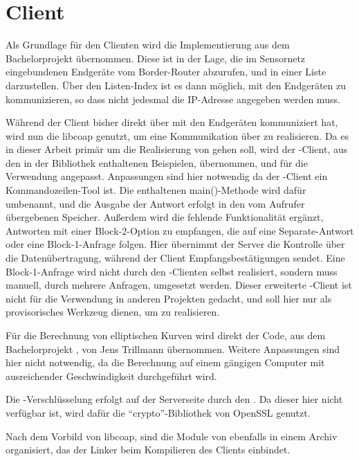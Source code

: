 \section{Client}
\label{sec:client}

Als Grundlage für den Clienten wird die Implementierung aus dem Bachelorprojekt  übernommen. Diese ist in der Lage, die im Sensornetz eingebundenen
Endgeräte vom Border-Router abzurufen, und in einer Liste darzustellen. Über den Listen-Index ist es dann möglich, mit den Endgeräten zu kommunizieren,
so dass nicht jedesmal die IP-Adresse angegeben werden muss.

Während der Client bisher direkt über  mit den Endgeräten kommuniziert hat, wird nun die libcoap \cite{libcoap} genutzt, um eine Kommunikation
über  zu realisieren. Da es in dieser Arbeit primär um die Realisierung von  gehen soll, wird der -Client, aus den in der
Bibliothek enthaltenen Beispielen, übernommen, und für die Verwendung angepasst. Anpassungen sind hier notwendig da der -Client ein
Kommandozeilen-Tool ist. Die enthaltenen main()-Methode wird dafür umbenannt, und die Ausgabe der Antwort erfolgt in den vom Aufrufer übergebenen Speicher.
Außerdem wird die fehlende Funktionalität ergänzt, Antworten mit einer Block-2-Option zu empfangen, die auf eine Separate-Antwort oder eine Block-1-Anfrage
folgen. Hier übernimmt der Server die Kontrolle über die Datenübertragung, während der Client Empfangsbestätigungen sendet. Eine Block-1-Anfrage wird
nicht durch den -Clienten selbst realisiert, sondern muss manuell, durch mehrere Anfragen, umgesetzt werden. Dieser erweiterte -Client
ist nicht für die Verwendung in anderen Projekten gedacht, und soll hier nur als provisorisches Werkzeug dienen, um  zu realisieren.

Für die Berechnung von elliptischen Kurven wird direkt der Code, aus dem Bachelorprojekt , von Jens Trillmann übernommen. Weitere Anpassungen
sind hier nicht notwendig, da die Berechnung auf einem gängigen Computer mit ausreichender Geschwindigkeit durchgeführt wird.

Die -Verschlüsselung erfolgt auf der Serverseite durch den . Da dieser hier nicht verfügbar ist, wird dafür die
"`crypto"'-Bibliothek von OpenSSL \cite{openssl} genutzt. 

Nach dem Vorbild von libcoap, sind die Module von  ebenfalls in einem Archiv organisiert, das der Linker beim Kompilieren des Clients einbindet.

